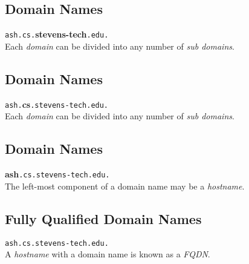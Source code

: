 \documentclass[xga]{xdvislides}
\begin{document}
\subsection{Domain Names}
\vspace{.5in}
\begin{center}
	\Huge
	\verb+ash.cs.+{\bf stevens-tech}\verb+.edu.+ \\
	\vspace{.5in}
	Each {\em domain} can be divided into any number of {\em sub domains}.
\end{center}
\Normalsize

\subsection{Domain Names}
\vspace{.5in}
\begin{center}
	\Huge
	\verb+ash.+{\bf cs}\verb+.stevens-tech.edu.+ \\
	\vspace{.5in}
	Each {\em domain} can be divided into any number of {\em sub domains}.
\end{center}
\Normalsize

\subsection{Domain Names}
\vspace{.5in}
\begin{center}
	\Huge
	{\bf ash}\verb+.cs.stevens-tech.edu.+ \\
	\vspace{.5in}
	The left-most component of a domain name may be a {\em hostname}.
\end{center}
\Normalsize

\subsection{Fully Qualified Domain Names}
\vspace{.5in}
\begin{center}
	\Huge
	\verb+ash.cs.stevens-tech.edu.+ \\
	\vspace{.5in}
	A {\em hostname} with a domain name is known as a {\em FQDN}.
\end{center}
\Normalsize
\end{document}
